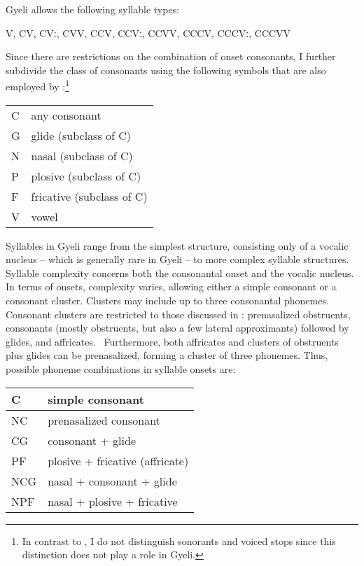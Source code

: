 Gyeli allows the following syllable types:

\begin{center}V, CV, CVː, CVV, CCV, CCVː, CCVV, CCCV, CCCVː, CCCVV \end{center}

\noindent Since there are restrictions on the combination of onset consonants, I further subdivide the class of consonants using the following symbols that are also employed by \citet[41]{velde2008}:\footnote{In contrast to \citet[41]{velde2008}, I do not distinguish sonorants and voiced stops since this distinction does not play a role in Gyeli.} 

\begin{center}
\begin{tabular}{ll}
C & any consonant \\
G & glide (subclass of C) \\
N & nasal (subclass of C) \\
P & plosive (subclass of C) \\
F & fricative (subclass of C) \\
V & vowel
\end{tabular}
\end{center}

\noindent Syllables in Gyeli range from the simplest structure, consisting only of a vocalic nucleus -- which is generally rare in Gyeli -- to more complex syllable structures. Syllable complexity concerns both the consonantal onset and the vocalic nucleus.  In terms of onsets, complexity varies, allowing either a simple consonant or a consonant cluster. Clusters may include up to three consonantal phonemes. Consonant clusters are restricted to those discussed in : prenasalized obstruents, consonants (mostly obstruents, but also a few lateral approximants) followed by glides, and affricates.%
\ Furthermore, both affricates and clusters of obstruents plus glides can be prenasalized, forming a cluster of three phonemes. Thus, possible phoneme combinations in syllable onsets are: 

\begin{center}
\begin{tabular}{ll}
C & simple consonant \\  \midrule
NC & prenasalized consonant \\
CG & consonant + glide \\ 
PF & plosive + fricative (affricate) \\  \midrule
NCG & nasal + consonant + glide \\
NPF & nasal + plosive + fricative
\end{tabular}
\end{center}

